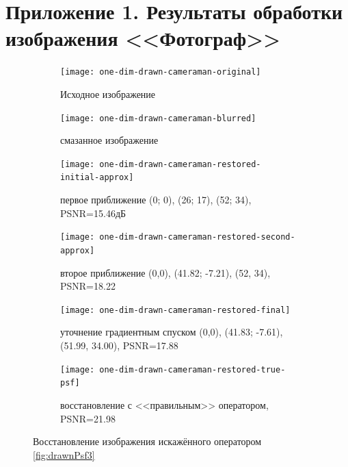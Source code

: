 \chapter*{Приложение 1. Результаты обработки изображения <<Фотограф>>}
\begin{figure}[h!]
	\centering
	\begin{subfigure}[t]{0.32\textwidth}
		\centering
		\texttt{[image: one-dim-drawn-cameraman-original]}
		\caption{Исходное изображение}
	\end{subfigure}
	\hfill
	\begin{subfigure}[t]{0.32\textwidth}
		\centering
		\texttt{[image: one-dim-drawn-cameraman-blurred]}
		\caption{смазанное изображение}
	\end{subfigure}
	\hfill
	\begin{subfigure}[t]{0.32\textwidth}
		\centering
		\texttt{[image: one-dim-drawn-cameraman-restored-initial-approx]}
		\caption{первое приближение (0; 0), (26; 17), (52; 34), PSNR=15.46дБ}
	\end{subfigure}
	\begin{subfigure}[t]{0.32\textwidth}
		\centering
		\texttt{[image: one-dim-drawn-cameraman-restored-second-approx]}
		\caption{второе приближение (0,0), (41.82; -7.21), (52, 34), PSNR=18.22}
	\end{subfigure}
	\hfill
	\begin{subfigure}[t]{0.32\textwidth}
		\centering
		\texttt{[image: one-dim-drawn-cameraman-restored-final]}
		\caption{уточнение градиентным спуском (0,0), (41.83; -7.61), (51.99, 34.00), PSNR=17.88}
	\end{subfigure}
	\hfill
	\begin{subfigure}[t]{0.32\textwidth}
		\centering
		\texttt{[image: one-dim-drawn-cameraman-restored-true-psf]}
		\caption{восстановление с <<правильным>> оператором, PSNR=21.98}
	\end{subfigure}
	\label{fig:oneDimDrawnCameraman}
	\caption{Восстановление изображения искажённого оператором \ref{fig:drawnPsf3}}
\end{figure}

